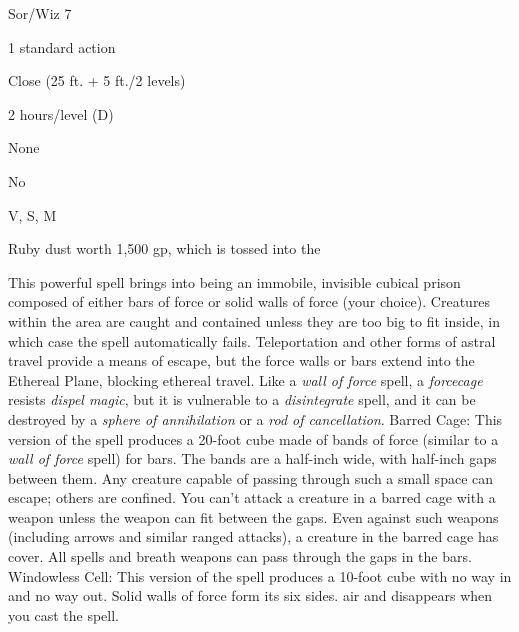 
\begin{description*}
\item[Level:] Sor/Wiz 7
\item[Casting Time:] 1 standard action
\item[Range:] Close (25 ft. + 5 ft./2 levels)
\item[Duration:] 2 hours/level (D)
\item[Saving Throw:] None
\item[Spell Resistance:] No
\item[Components:] V, S, M
\item[Arcane Material Component:] Ruby dust worth 1,500 gp, which is tossed into the
\end{description*}

This powerful spell brings into being an immobile, invisible cubical prison composed
of either bars of force or solid walls of force (your choice).
Creatures within the area are caught and contained unless they are too big to fit
inside, in which case the spell automatically fails. Teleportation and other forms
of astral travel provide a means of escape, but the force walls or bars extend
into the Ethereal Plane, blocking ethereal travel.
Like a \textit{wall of force} spell, a \textit{forcecage} resists \textit{dispel
magic}, but it is vulnerable to a \textit{disintegrate} spell, and it can be destroyed
by a \textit{sphere of annihilation} or a \textit{rod of cancellation}.
Barred Cage: This version of the spell produces a 20-foot cube made of
bands of force (similar to a \textit{wall of force} spell) for bars. The bands
are a half-inch wide, with half-inch gaps between them. Any creature capable of
passing through such a small space can escape; others are confined. You can't attack
a creature in a barred cage with a weapon unless the weapon can fit between the
gaps. Even against such weapons (including arrows and similar ranged attacks),
a creature in the barred cage has cover. All spells and breath weapons can pass
through the gaps in the bars.
Windowless Cell: This version of the spell produces a 10-foot cube with
no way in and no way out. Solid walls of force form its six sides.
air and disappears when you cast the spell.